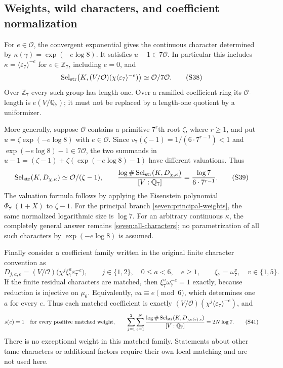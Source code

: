 \subsection{Weights, wild characters, and coefficient normalization}
\label{seven:weights}

For $e\in\mathcal O$, the convergent exponential gives the continuous
character determined by
$\kappa(\gamma)=\exp(-e\log8)$.
It satisfies $u-1\in7\mathcal O$. In particular this includes
$\kappa=\langle\varepsilon_7\rangle^{-e}$ for $e\in\mathbb Z_7$, including
$e=0$, and
\[
 \operatorname{Sel}_{\rm str}
   \bigl(K,(V/\mathcal O)(\chi\langle\varepsilon_7\rangle^{-e})\bigr)
 \simeq\mathcal O/7\mathcal O.
 \tag{S38}\label{seven:principal-weights}
\]
Over $\mathbb Z_7$ every such group has length one.
Over a ramified coefficient ring its $\mathcal O$-length is
$e(V/\mathbb Q_7)$; it must not be replaced by a length-one quotient by
a uniformizer.

More generally, suppose $\mathcal O$ contains a primitive $7^r$th root
$\zeta$, where $r\ge1$, and put
$u=\zeta\exp(-e\log8)$ with $e\in\mathcal O$.
Since
$v_7(\zeta-1)=1/(6\cdot7^{r-1})<1$
and $\exp(-e\log8)-1\in7\mathcal O$, the two summands in
$u-1=(\zeta-1)+\zeta(\exp(-e\log8)-1)$ have different valuations.
Thus
\[
 \operatorname{Sel}_{\rm str}(K,D_{\chi,\kappa})
 \simeq\mathcal O/(\zeta-1),\qquad
 \frac{\log\#\operatorname{Sel}_{\rm str}(K,D_{\chi,\kappa})}
      {[V:\mathbb Q_7]}
 =\frac{\log7}{6\cdot7^{r-1}}.
 \tag{S39}\label{seven:wild-cost}
\]
The valuation formula follows by applying the Eisenstein polynomial
$\Phi_{7^r}(1+X)$ to $\zeta-1$.
For the principal branch \eqref{seven:principal-weights}, the same
normalized logarithmic size is $\log7$.
For an arbitrary continuous $\kappa$, the completely general answer
remains \eqref{seven:all-characters}; no parametrization of all such
characters by $\exp(-e\log8)$ is assumed.

Finally consider a coefficient family written in the original finite
character convention as
\[
 D_{j,a,e}=(V/\mathcal O)
    \bigl(\chi^j\xi_7^a\varepsilon_7^{-e}\bigr),\qquad
 j\in\{1,2\},\quad0\le a<6,\quad e\ge1,
 \qquad \xi_7=\omega_7^v,\quad v\in\{1,5\}.
 \tag{S40}\label{seven:matched-coefficients}
\]
If the finite residual characters are matched, then
$\xi_7^a\omega_7^{-e}=1$ exactly, because reduction is injective on
$\mu_6$. Equivalently, $va\equiv e\pmod6$, which determines one $a$
for every $e$. Thus each matched coefficient is exactly
$(V/\mathcal O)(\chi^j\langle\varepsilon_7\rangle^{-e})$, and
\[
 s(e)=1\quad\hbox{for every positive matched weight},\qquad
 \sum_{j=1}^{2}\sum_{e=1}^{N}
 \frac{\log\#\operatorname{Sel}_{\rm str}(K,D_{j,a(e),e})}
      {[V:\mathbb Q_7]}
 =2N\log7.
 \tag{S41}\label{seven:matched-cost}
\]
There is no exceptional weight in this matched family. Statements about
other tame characters or additional factors require their own local
matching and are not used here.

